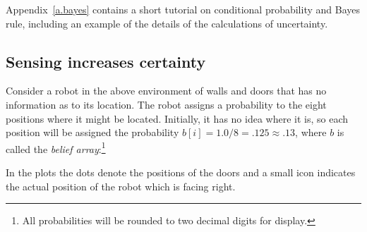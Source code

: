 Appendix~\ref{a.bayes} contains a short tutorial on conditional probability and Bayes rule, including an example of the details of the calculations of uncertainty.

\subsection{Sensing increases certainty}

Consider a robot in the above environment of walls and doors that has no information as to its location. The robot assigns a probability to the eight positions where it might be located. Initially, it has no idea where it is, so each position will be assigned the probability $b[i]=1.0/8=.125\approx .13$, where $b$ is called the \emph{belief array}:\footnote{All probabilities will be rounded to two decimal digits for display.}
\begin{center}
\end{center}
\vspace{-1ex}
In the plots the dots denote the positions of the doors and a small icon indicates the actual position of the robot which is facing right.

